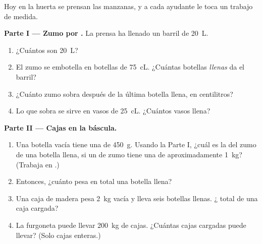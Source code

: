 \begin{problem}\label{pb:g6:mass-and-volume:1}
Hoy en la huerta se prensan las manzanas, y a cada ayudante le toca un
trabajo de medida.

\medskip\noindent\textbf{Parte I --- Zumo por .}
La prensa ha llenado un barril de \qty{20}{L}.
\begin{enumerate}
  \item ¿Cuántos  son \qty{20}{L}?
  \item El zumo se embotella en botellas de \qty{75}{cL}. ¿Cuántas
        botellas \emph{llenas} da el barril?
  \item ¿Cuánto zumo sobra después de la última botella llena, en
        centilitros?
  \item Lo que sobra se sirve en vasos de \qty{25}{cL}. ¿Cuántos
        vasos llena?
\end{enumerate}

\medskip\noindent\textbf{Parte II --- Cajas en la báscula.}
\begin{enumerate}[resume]
  \item Una botella vacía tiene una  de \qty{450}{g}. Usando la
        Parte I, ¿cuál es la  del zumo de una botella llena, si
        un  de zumo tiene una  de aproximadamente
        \qty{1}{kg}? (Trabaja en .)
  \item Entonces, ¿cuánto pesa en total una botella llena?
  \item Una caja de madera pesa \qty{2}{kg} vacía y lleva seis
        botellas llenas. ¿ total de una caja cargada?
  \item La furgoneta puede llevar \qty{200}{kg} de cajas. ¿Cuántas
        cajas cargadas puede llevar? (Solo cajas enteras.)
\end{enumerate}


\end{problem}
